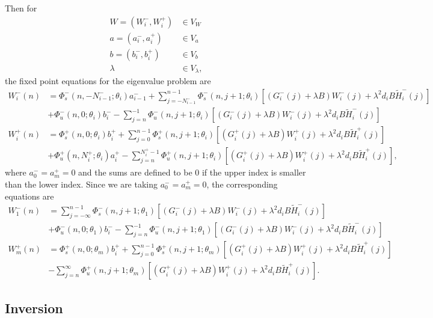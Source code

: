 \documentclass[12pt]{elsarticle}
\begin{document}
Then for
\begin{align*}
W = (W_i^-, W_i^+) &\in V_W \\
a = (a_i^-, a_i^+) &\in V_a \\
b = (b_i^-, b_i^+) &\in V_b \\
\lambda &\in V_\lambda,
\end{align*}
the fixed point equations for the eigenvalue problem are
\begin{equation}\label{fpeig}
\begin{aligned}
W_i^-(n) &= 
\Phi_s^-(n, -N_{i-1}^-; \theta_i) a_{i-1}^- + \sum_{j = -N_{i-1}^-}^{n-1} \Phi_s^-(n, j+1; \theta_i)
[(G_i^-(j) + \lambda B) W_i^-(j) + \lambda^2 d_i B \tilde{H}_i^-(j)]
 \\
&+ \Phi_u^-(n, 0; \theta_i) b_i^- - \sum_{j = n}^{-1} \Phi_u^-(n, j+1; \theta_i) 
[(G_i^-(j) + \lambda B) W_i^-(j) + \lambda^2 d_i B \tilde{H}_i^-(j)] \\
W_i^+(n) &= \Phi_s^+(n, 0; \theta_i) b_i^+ + \sum_{j = 0}^{n-1} \Phi_s^+(n, j+1; \theta_i) 
[(G_i^+(j) + \lambda B) W_i^+(j) + \lambda^2 d_i B \tilde{H}_i^+(j)] \\
&+ \Phi_u^+(n, N_i^+; \theta_i) a_i^+ - \sum_{j = n}^{N_i^+-1} \Phi_u^+(n, j+1; \theta_i) 
[(G_i^+(j) + \lambda B) W_i^+(j) + \lambda^2 d_i B \tilde{H}_i^+(j)],
\end{aligned}
\end{equation}
where $a_0^- = a_m^+ = 0$ and the sums are defined to be $0$ if the upper index is smaller than the lower index. Since we are taking $a_0^- = a_m^+ = 0$, the corresponding equations are
\begin{align*}
W_1^-(n) &= \sum_{j = -\infty}^{n-1} \Phi_s^-(n, j+1; \theta_1)
[(G_i^-(j) + \lambda B) W_i^-(j) + \lambda^2 d_i B \tilde{H}_i^-(j)]
 \\
&+ \Phi_u^-(n, 0; \theta_1) b_i^- - \sum_{j = n}^{-1} \Phi_u^-(n, j+1; \theta_1) 
[(G_i^-(j) + \lambda B) W_i^-(j) + \lambda^2 d_i B \tilde{H}_i^-(j)] \\
W_m^+(n) &= \Phi_s^+(n, 0; \theta_m) b_i^+ + \sum_{j = 0}^{n-1} \Phi_s^+(n, j+1; \theta_m) 
[(G_i^+(j) + \lambda B) W_i^+(j) + \lambda^2 d_i B \tilde{H}_i^+(j)] \\
&- \sum_{j = n}^{\infty} \Phi_u^+(n, j+1; \theta_m) 
[(G_i^+(j) + \lambda B) W_i^+(j) + \lambda^2 d_i B \tilde{H}_i^+(j)].
\end{align*}

\subsection{Inversion}
\end{document}

